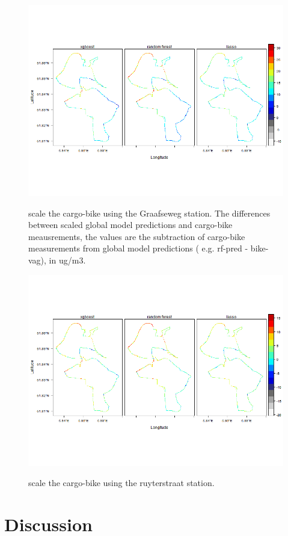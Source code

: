 \documentclass{article}
\begin{document}
\begin{figure}[h!]
    \includegraphics[width=\linewidth]{f4a.png}
    \label{Graafseweg}
    \caption {scale the cargo-bike using the Graafseweg station. The differences between scaled global model predictions and cargo-bike meausrements, the values are the subtraction of cargo-bike measurements from global model predictions ( e.g. rf-pred - bike-vag), in ug/m3.}
\end{figure}
\begin{figure}[h!]
    \includegraphics[width=\linewidth]{f4b.png}
    \label{ruyterstraat}
    \caption {scale the cargo-bike using the ruyterstraat station.}
\end{figure}


\section{Discussion}
\end{document}
